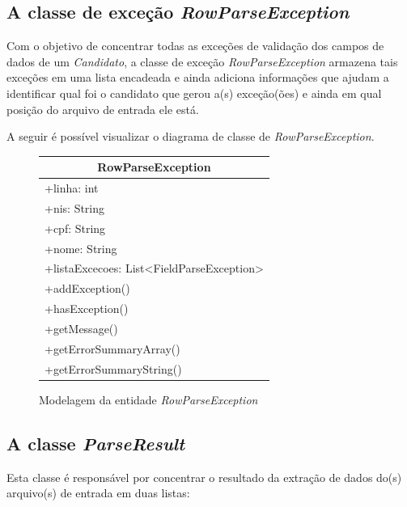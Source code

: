 \documentclass[
	12pt,			%
	openright,		%
	oneside,	
	a4paper,		%
	english,		%
	brazil			%
]{abntex2/abntex2}  %
\begin{document}
	\subsection{A classe de exceção \textit{RowParseException}}	

	Com o objetivo de concentrar todas as exceções de validação dos campos de dados de um \textit{Candidato}, a classe de exceção \textit{RowParseException} armazena tais exceções em uma lista encadeada e ainda adiciona informações que ajudam a identificar qual foi o candidato que gerou a(s) exceção(ões) e ainda em qual posição do arquivo de entrada ele está.
	
	A seguir é possível visualizar o diagrama de classe de \textit{RowParseException}.
	
	\begin{figure}[H]
		\begin{center}
			
			\caption{Modelagem da entidade \textit{RowParseException}}
			\label{rowparseexception-uml}

			\begin{tabular}{|l|}
				\hline
				\multicolumn{1}{|c|}{\textbf{RowParseException}} \\ \hline
				+linha: int \\
				+nis: String \\
				+cpf: String \\
				+nome: String \\
				+listaExcecoes: List\textless{}FieldParseException\textgreater{} \\ \hline
				+addException() \\
				+hasException() \\
				+getMessage() \\
				+getErrorSummaryArray() \\
				+getErrorSummaryString() \\ \hline
			\end{tabular}
			
		\end{center}
	\end{figure}

	\subsection{A classe \textit{ParseResult}} \label{cap-parse-result}
	
	Esta classe é responsável por concentrar o resultado da extração de dados do(s) arquivo(s) de entrada em duas listas:
		
\end{document}
